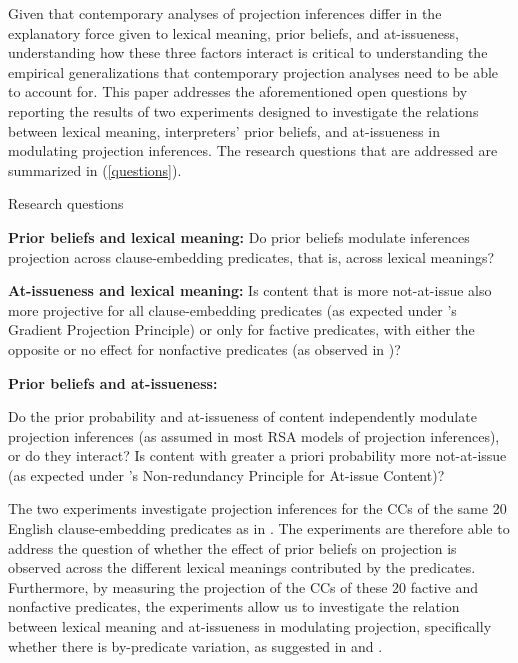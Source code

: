 \documentclass[11pt,fleqn]{article}
\newcommand{\6}{\mbox{$[\hspace*{-.6mm}[$}}
\newcommand{\9}{\mbox{$]\hspace*{-.6mm}]$}}
\newcommand{\citepos}[1]{\citeauthor{#1}'s \citeyear{#1}}
\begin{document}
Given that contemporary analyses of projection inferences differ in the explanatory force given to lexical meaning, prior beliefs, and at-issueness, understanding how these three factors interact is critical to understanding the empirical generalizations that contemporary projection analyses need to be able to account for. This paper addresses the aforementioned open questions by reporting the results of two experiments designed to investigate the relations between lexical meaning, interpreters' prior beliefs, and at-issueness in modulating projection inferences. The research questions that are addressed are summarized in (\ref{questions}). 

\begin{exe}
\ex\label{questions} Research questions
\begin{xlist}
 {\bf Prior beliefs and lexical meaning:} Do prior beliefs modulate inferences projection across clause-embedding predicates, that is, across lexical meanings? 

 {\bf At-issueness and lexical meaning:} Is content that is more not-at-issue also more projective for all clause-embedding predicates (as expected under \citepos{tbd-variability} Gradient Projection Principle) or only for factive predicates, with either the opposite or no effect for nonfactive predicates (as observed in \citealt{djaerv-bacovcin-salt27,djaerv-bacovcin2020,mahler-etal2020})?

 {\bf Prior beliefs and at-issueness:} 
\begin{xlist}
 Do the prior probability and at-issueness of content independently modulate projection inferences  (as assumed in most RSA models of projection inferences), or do they interact? 
 Is content with greater a priori probability more not-at-issue (as expected under \citepos{tonhauser-etal-eval} Non-redundancy Principle for At-issue Content)? 
\end{xlist}
\end{xlist}
\end{exe}

The two experiments investigate projection inferences for the CCs of the same 20 English clause-embedding predicates as in \cite{degen-tonhauser-openmind,degen-tonhauser-language}. The experiments are therefore able to address the question of whether the effect of prior beliefs on projection is observed across the different lexical meanings contributed by the predicates. Furthermore, by measuring the projection of the CCs of these 20  factive and nonfactive predicates, the experiments allow us to investigate the relation between lexical meaning and at-issueness in modulating projection, specifically whether there is by-predicate variation, as suggested in \citet{djaerv-bacovcin-salt27,djaerv-bacovcin2020} and \citet{mahler-etal2020}. 
\end{document}

